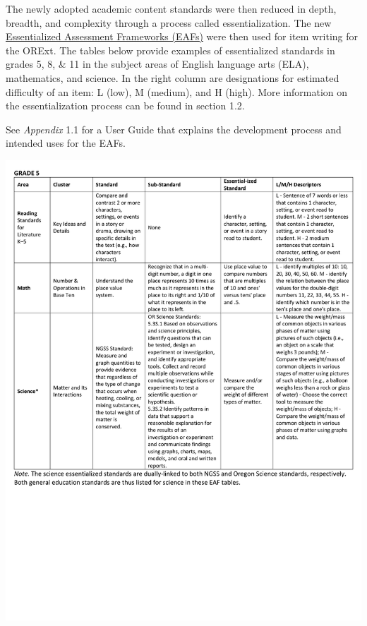 \documentclass[]{article}
\begin{document}
The newly adopted academic content standards were then reduced in depth,
breadth, and complexity through a process called essentialization. The
new
\color{link}\href{http://www.brtprojects.org/publications/training-modules}{Essentialized
Assessment Frameworks (EAFs)} \color{black} were then used for item
writing for the ORExt. The tables below provide examples of
essentialized standards in grades 5, 8, \& 11 in the subject areas of
English language arts (ELA), mathematics, and science. In the right
column are designations for estimated difficulty of an item: L (low), M
(medium), and H (high). More information on the essentialization process
can be found in section 1.2.

See \emph{Appendix} 1.1 for a User Guide that explains the development
process and intended uses for the EAFs.

\FloatBarrier
\includegraphics{Figures/Standards/Grade5.pdf}
\end{document}
